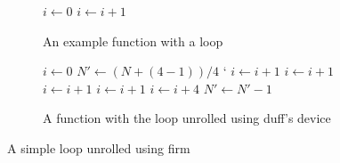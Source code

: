 \begin{figure}[h]
    \begin{subfigure}[b]{0.5\textwidth}
        \centering
        \begin{algorithmic}
                \State $i \gets 0$
                    \State {}
                    \State $i \gets i + 1$
                \EndWhile
            \EndFunction
        \end{algorithmic}
        \caption{An example function with a loop}
    \end{subfigure}
    \begin{subfigure}[b]{0.5\textwidth}
        \centering
        \begin{algorithmic}
                \State $i \gets 0$
                \State $N' \gets (N + (4 - 1)) / 4$
`               
                        \State {}
                        \State $i \gets i + 1$ 
                    \EndCase
                        \State {}
                        \State $i \gets i + 1$ 
                    \EndCase
                        \State {}
                        \State $i \gets i + 1$ 
                    \EndCase
                        \State {}
                        \State $i \gets i + 1$
                    \EndCase
                \EndSwitch
                    \State {}
                    \State {}
                    \State {}
                    \State {}
                    \State $i \gets i + 4$
                    \State $N' \gets N' - 1$
                \EndWhile
            \EndFunction
        \end{algorithmic}
        \caption{A function with the loop unrolled using duff's device}
    \end{subfigure}
    \caption{A simple loop unrolled using firm}
    \label{fig:basics:duff}
\end{figure}